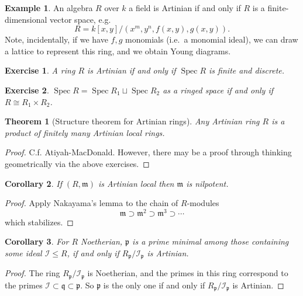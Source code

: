 \documentclass{article}
\newcommand{\fr}{\mathfrak}
\DeclareMathOperator{\Spec}{Spec}
\theoremstyle{plain}
\newtheorem{thm}{Theorem}
\newtheorem{cor}[thm]{Corollary}
\newtheorem{exc}{Exercise}
\theoremstyle{definition}
\newtheorem{exmp}{Example}
\theoremstyle{remark}
\begin{document}
\begin{exmp}
    An algebra $R$ over $k$ a field is Artinian if and only if $R$ is a finite-dimensional
    vector space, e.g.
    \[R=k[x,y]/(x^m,y^n,f(x,y),g(x,y)).\]
    Note, incidentally, if we have $f,g$ monomials (i.e.~a monomial ideal), we can draw a lattice to represent
    this ring, and we obtain Young diagrams.
\end{exmp}

\begin{exc}
    A ring $R$ is Artinian if and only if $\Spec R$ is finite and discrete.
\end{exc}

\begin{exc}
    $\Spec R=\Spec R_1\sqcup \Spec R_2$ as a ringed space if and only if $R\cong R_1\times R_2$.
\end{exc}

\begin{thm}[Structure theorem for Artinian rings]
    Any Artinian ring $R$ is a product of finitely many Artinian local rings.
\end{thm}
\begin{proof}
    C.f. Atiyah-MacDonald. However, there may be a proof through thinking geometrically
    via the above exercises.
\end{proof}

\begin{cor}
    If $(R,\fr m)$ is Artinian local then $\fr m$ is nilpotent.    
\end{cor}
\begin{proof}
    Apply Nakayama's lemma to the chain of $R$-modules
    \[\fr m\supset \fr m^2\supset \fr m^3\supset \cdots\]
    which stabilizes.
\end{proof}

\begin{cor}
    For $R$ Noetherian, $\fr p$ is a prime minimal among those containing some ideal $\mathcal{I}\leq R$,
    if and only if $R_{\fr p}/\mathcal{I}_{\fr p}$ is Artinian.
\end{cor}
\begin{proof}
    The ring $R_{\fr p}/\mathcal{I}_{\fr p}$ is Noetherian, and the primes in this ring correspond
    to the primes $\mathcal{I}\subset\fr q\subset\fr p$. So $\fr p$ is the only one if and only if $R_{\fr p}/\mathcal{I}_{\fr p}$
    is Artinian.
\end{proof}
\end{document}
